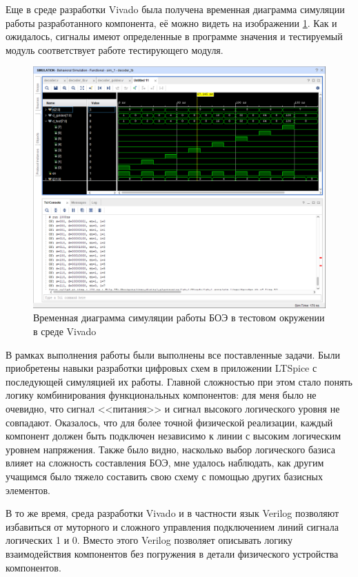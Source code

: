Еще в среде разработки Vivado была получена временная диаграмма симуляции работы
разработанного компонента, её можно видеть на изображении
\ref{fig:decoder-vivado-symulation}. Как и ожидалось, сигналы имеют определенные
в программе значения и тестируемый модуль соответствует работе тестирующего
модуля.

\begin{figure}[H]
    \centering
    \includegraphics[width=\textwidth]{res/3-to-8-decoder_vivado-simulation.png}
    \caption{Временная диаграмма симуляции работы БОЭ в тестовом окружении в среде Vivado}
    \label{fig:decoder-vivado-symulation}
\end{figure}


В рамках выполнения работы были выполнены все поставленные задачи. Были
приобретены навыки разработки цифровых схем в приложении LTSpice с последующей
симуляцией их работы. Главной сложностью при этом стало понять логику
комбинирования функциональных компонентов: для меня было не очевидно, что сигнал
<<питания>> и сигнал высокого логического уровня не совпадают. Оказалось, что
для более точной физической реализации, каждый компонент должен быть подключен
независимо к линии с высоким логическим уровнем напряжения. Также было видно, насколько
выбор логического базиса влияет на сложность составления БОЭ, мне удалось наблюдать, как
другим учащимся было тяжело составить свою схему с помощью других базисных элементов.

В то же время, среда разработки Vivado и в частности язык Verilog позволяют избавиться от муторного и сложного управления подключением линий сигнала логических 1 и 0. Вместо этого Verilog позволяет описывать логику взаимодействия компонентов без погружения в детали физического устройства компонентов. 

